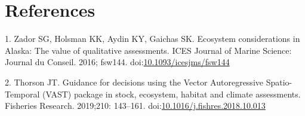 \documentclass[10pt,]{article}
\begin{document}
\hypertarget{references}{%
\section*{References}\label{references}}

\hypertarget{refs}{}
\leavevmode\hypertarget{ref-zador_ecosystem_2016}{}%
1. Zador SG, Holsman KK, Aydin KY, Gaichas SK. Ecosystem considerations
in Alaska: The value of qualitative assessments. ICES Journal of Marine
Science: Journal du Conseil. 2016; fsw144.
doi:\href{https://doi.org/10.1093/icesjms/fsw144}{10.1093/icesjms/fsw144}

\leavevmode\hypertarget{ref-thorson_guidance_2019}{}%
2. Thorson JT. Guidance for decisions using the Vector Autoregressive
Spatio-Temporal (VAST) package in stock, ecosystem, habitat and climate
assessments. Fisheries Research. 2019;210: 143--161.
doi:\href{https://doi.org/10.1016/j.fishres.2018.10.013}{10.1016/j.fishres.2018.10.013}
\end{document}

